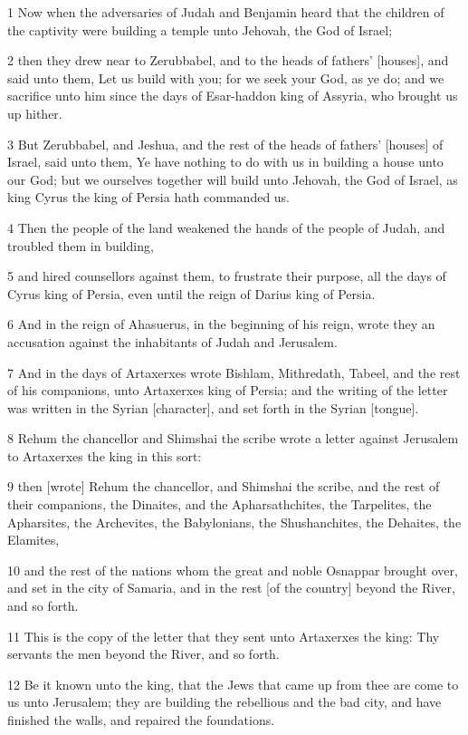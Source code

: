 \par 1 Now when the adversaries of Judah and Benjamin heard that the children of the captivity were building a temple unto Jehovah, the God of Israel;
\par 2 then they drew near to Zerubbabel, and to the heads of fathers' [houses], and said unto them, Let us build with you; for we seek your God, as ye do; and we sacrifice unto him since the days of Esar-haddon king of Assyria, who brought us up hither.
\par 3 But Zerubbabel, and Jeshua, and the rest of the heads of fathers' [houses] of Israel, said unto them, Ye have nothing to do with us in building a house unto our God; but we ourselves together will build unto Jehovah, the God of Israel, as king Cyrus the king of Persia hath commanded us.
\par 4 Then the people of the land weakened the hands of the people of Judah, and troubled them in building,
\par 5 and hired counsellors against them, to frustrate their purpose, all the days of Cyrus king of Persia, even until the reign of Darius king of Persia.
\par 6 And in the reign of Ahasuerus, in the beginning of his reign, wrote they an accusation against the inhabitants of Judah and Jerusalem.
\par 7 And in the days of Artaxerxes wrote Bishlam, Mithredath, Tabeel, and the rest of his companions, unto Artaxerxes king of Persia; and the writing of the letter was written in the Syrian [character], and set forth in the Syrian [tongue].
\par 8 Rehum the chancellor and Shimshai the scribe wrote a letter against Jerusalem to Artaxerxes the king in this sort:
\par 9 then [wrote] Rehum the chancellor, and Shimshai the scribe, and the rest of their companions, the Dinaites, and the Apharsathchites, the Tarpelites, the Apharsites, the Archevites, the Babylonians, the Shushanchites, the Dehaites, the Elamites,
\par 10 and the rest of the nations whom the great and noble Osnappar brought over, and set in the city of Samaria, and in the rest [of the country] beyond the River, and so forth.
\par 11 This is the copy of the letter that they sent unto Artaxerxes the king: Thy servants the men beyond the River, and so forth.
\par 12 Be it known unto the king, that the Jews that came up from thee are come to us unto Jerusalem; they are building the rebellious and the bad city, and have finished the walls, and repaired the foundations.
